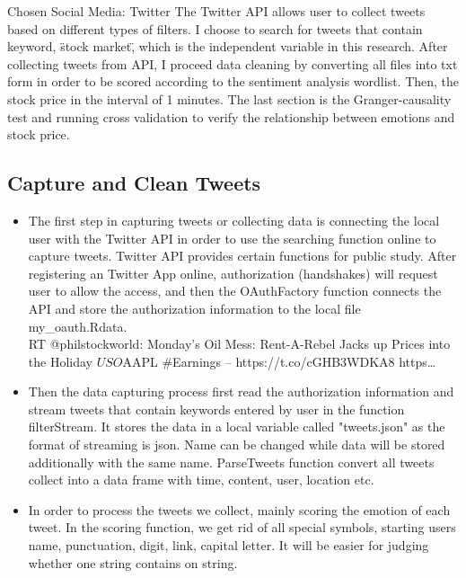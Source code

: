 \documentclass[a0,landscape]{a0poster}\usepackage[]{graphicx}\usepackage[]{color}
\newenvironment{knitrout}{}{} %
\begin{document}
\begin{multicols}{4}
Chosen Social Media: Twitter
 The Twitter API allows user to collect tweets based on different types of filters. I choose to search for tweets that contain keyword, \"stock market\", which is the independent variable in this research. After collecting tweets from API, I proceed data cleaning by converting all files into txt form in order to be scored according to the sentiment analysis wordlist. Then, the stock price in the interval of 1 minutes. The last section is the Granger-causality test and running cross validation to verify the relationship between emotions and stock price.


\subsection*{Capture and Clean Tweets}




\begin{itemize}
\item The first step in capturing tweets or collecting data is connecting the local user with the Twitter API in order to use the searching function online to capture tweets. Twitter API provides certain functions for public study. After registering an Twitter App online, authorization (handshakes) will request user to allow the access, and then the OAuthFactory function connects the API and store the authorization information to the local file my\_oauth.Rdata.
\\


\begin{knitrout}
\color{fgcolor}RT @philstockworld: Monday’s Oil Mess: Rent-A-Rebel Jacks up Prices into the Holiday $USO $AAPL 
#Earnings -- https://t.co/cGHB3WDKA8 https…
\end{knitrout}

\bigskip

\item Then the data capturing process first read the authorization information and stream tweets that contain keywords entered by user in the function filterStream. It stores the data in a local variable called "tweets.json" as the format of streaming is json. Name can be changed while data will be stored additionally with the same name. ParseTweets function convert all tweets collect into a data frame with time, content, user, location etc. 


\item In order to process the tweets we collect, mainly scoring the emotion of each tweet. In the scoring function, we get rid of all special symbols, starting users name,  punctuation, digit, link, capital letter. It will be easier for judging whether one string contains on string. 


\end{itemize}
\end{multicols}
\end{document}
